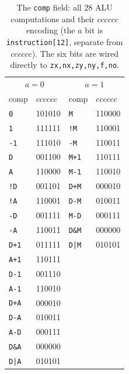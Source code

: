 \documentclass[11pt]{article}
\begin{document}
\begin{table}[h]
\centering
\small
\begin{tabular}{@{}l l | l l@{}}
\toprule
\multicolumn{2}{c}{$a=0$} & \multicolumn{2}{c}{$a=1$} \\
comp & $cccccc$ & comp & $cccccc$ \\
\midrule
\texttt{0} & 101010 & \texttt{M} & 110000 \\
\texttt{1} & 111111 & \texttt{!M} & 110001 \\
\texttt{-1} & 111010 & \texttt{-M} & 110011 \\
\texttt{D} & 001100 & \texttt{M+1} & 110111 \\
\texttt{A} & 110000 & \texttt{M-1} & 110010 \\
\texttt{!D} & 001101 & \texttt{D+M} & 000010 \\
\texttt{!A} & 110001 & \texttt{D-M} & 010011 \\
\texttt{-D} & 001111 & \texttt{M-D} & 000111 \\
\texttt{-A} & 110011 & \texttt{D\&M} & 000000 \\
\texttt{D+1} & 011111 & \texttt{D|M} & 010101 \\
\texttt{A+1} & 110111 & & \\
\texttt{D-1} & 001110 & & \\
\texttt{A-1} & 110010 & & \\
\texttt{D+A} & 000010 & & \\
\texttt{D-A} & 010011 & & \\
\texttt{A-D} & 000111 & & \\
\texttt{D\&A} & 000000 & & \\
\texttt{D|A} & 010101 & & \\
\bottomrule
\end{tabular}
\caption{The \texttt{comp} field: all 28 ALU computations and their $cccccc$ encoding (the $a$ bit is \texttt{instruction[12]}, separate from $cccccc$). The six bits are wired directly to \texttt{zx,nx,zy,ny,f,no}.}
\label{tab:lab4-comp}
\end{table}
\end{document}
